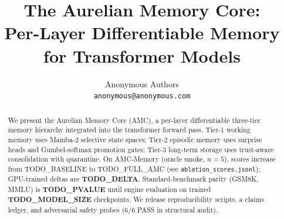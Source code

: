 \documentclass{article}
\title{The Aurelian Memory Core: \\Per-Layer Differentiable Memory for Transformer Models}
\author{
  Anonymous Authors \\
  \texttt{anonymous@anonymous.com}
}
\begin{document}
\maketitle

\begin{abstract}
We present the Aurelian Memory Core (AMC), a per-layer differentiable
three-tier memory hierarchy integrated into the transformer forward pass.
Tier-1 working memory uses Mamba-2 selective state spaces; Tier-2 episodic
memory uses surprise heads and Gumbel-softmax promotion gates; Tier-3
long-term storage uses trust-aware consolidation with quarantine.
On AMC-Memory (oracle smoke, $n{=}5$), scores increase from
TODO\_BASELINE to TODO\_FULL\_AMC (see
\texttt{ablation\_scores.jsonl}); GPU-trained deltas are
\textbf{TODO\_DELTA}. Standard-benchmark parity (GSM8K, MMLU) is
\textbf{TODO\_PVALUE} until engine evaluation on trained
\textbf{TODO\_MODEL\_SIZE} checkpoints. We release reproducibility
scripts, a claims ledger, and adversarial safety probes (6/6 PASS in
structural audit).
\end{abstract}












\end{document}
